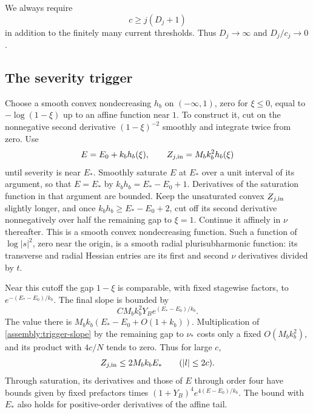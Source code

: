 We always require
\begin{equation}\label{assembly:height-rate}
 c\geq j(D_j+1)
\end{equation}
in addition to the finitely many current thresholds. Thus $D_j\to\infty$
and $D_j/c_j\to0$.

\subsection{The severity trigger}

Choose a smooth convex nondecreasing $h_b$ on $(-\infty,1)$, zero
for $\xi\leq0$, equal to $-\log(1-\xi)$ up to an affine function near
$1$. To construct it, cut on the nonnegative second derivative
$(1-\xi)^{-2}$ smoothly and integrate twice from zero.
Use
\begin{equation}\label{assembly:trigger}
 E=E_0+k_bh_b(\xi),\qquad Z_{j,\rm in}=M_bk_b^2h_b(\xi)
\end{equation}
until severity is near $E_*$. Smoothly saturate $E$ at $E_*$ over
a unit interval of its argument, so that $E=E_*$ by
$k_bh_b=E_*-E_0+1$. Derivatives of the saturation function in that
argument are bounded. Keep the unsaturated convex $Z_{j,\rm in}$
slightly longer, and once $k_bh_b\geq E_*-E_0+2$, cut off its
second derivative nonnegatively over half the remaining gap to
$\xi=1$. Continue it affinely in $\nu$ thereafter. This is a smooth
convex nondecreasing function. Such a function of $\log|s|^2$,
zero near the origin, is a smooth radial plurisubharmonic function:
its transverse and radial Hessian entries are its first and second
$\nu$ derivatives divided by $t$.

Near this cutoff the gap $1-\xi$ is comparable, with fixed stagewise
factors, to $e^{-(E_*-E_0)/k_b}$. The final slope is bounded by
\begin{equation}\label{assembly:trigger-slope}
 C M_bk_b^2Y_Be^{(E_*-E_0)/k_b}.
\end{equation}
The value there is $M_bk_b(E_*-E_0+O(1+k_b))$. Multiplication
of \eqref{assembly:trigger-slope} by the remaining gap to $\nu_*$
costs only a fixed $O(M_bk_b^2)$, and its product with $4c/N$
tends to zero. Thus for large $c$,
\begin{equation}\label{assembly:trigger-value}
 Z_{j,\rm in}\leq2M_bk_bE_*\qquad(|l|\leq2c).
\end{equation}
Through saturation, its derivatives and those of $E$ through order
four have bounds given by fixed prefactors times
$(1+Y_B)^4 e^{4(E-E_0)/k_b}$.
The bound with $E_*$ also holds for positive-order derivatives of
the affine tail.

